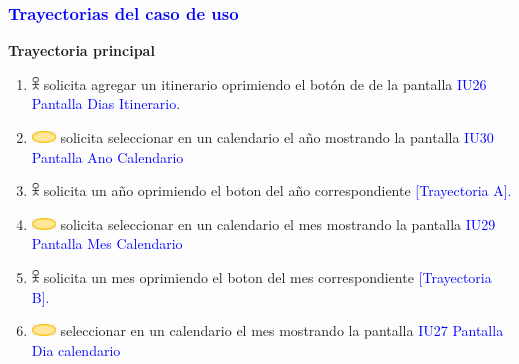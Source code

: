 \pagebreak
\subsubsection{\textcolor{blue}{Trayectorias del caso de uso}}

\textbf{Trayectoria principal}
\begin{enumerate}

\item \includegraphics[width=0.0150\textwidth]{Figuras/persona.png} solicita agregar un itinerario oprimiendo el botón de \textbf{\fbox{+}} de la pantalla \textcolor{blue}{IU26 Pantalla Dias Itinerario}.

\item \includegraphics[width=0.0500\textwidth]{Figuras/sistema.png} solicita seleccionar en un calendario el año mostrando la pantalla \textcolor{blue}{IU30 Pantalla Ano Calendario}

\item \includegraphics[width=0.0150\textwidth]{Figuras/persona.png} solicita un año oprimiendo el boton  del año correspondiente \textcolor{blue}{[Trayectoria A].}

\item \includegraphics[width=0.0500\textwidth]{Figuras/sistema.png} solicita seleccionar en un calendario el mes mostrando la pantalla \textcolor{blue}{IU29 Pantalla Mes Calendario}

\item \includegraphics[width=0.0150\textwidth]{Figuras/persona.png} solicita un mes oprimiendo el boton  del mes correspondiente \textcolor{blue}{[Trayectoria B].}

\item \includegraphics[width=0.0500\textwidth]{Figuras/sistema.png} seleccionar en un calendario el mes mostrando la pantalla \textcolor{blue}{IU27 Pantalla Dia calendario}


\end{enumerate}

